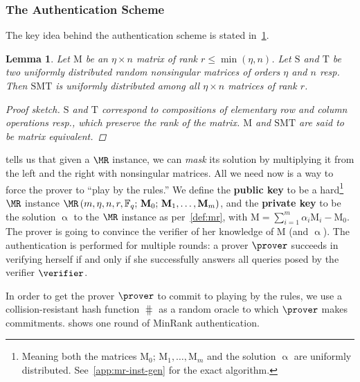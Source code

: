 \documentclass{article}
\theoremstyle{remark}
\theoremstyle{definition}
\theoremstyle{plain}
\newtheorem{lemma}{Lemma}
\renewcommand*{\vec}[1]{\bm{\mathrm{#1}}}
\newcommand{\matr}[1]{\bm{\mathrm{#1}}}
\begin{document}
\subsubsection{The Authentication Scheme}\label{sec:sch}
The key idea behind the authentication scheme is stated in~\cref{lem:rnk-mask}.
\begin{lemma}\label{lem:rnk-mask}
  Let $\matr{M}$ be an $\eta \times n$ matrix of rank $r \le \min(\eta, n)$.
  Let $\matr{S}$ and $\matr{T}$ be two uniformly distributed random nonsingular
  matrices of orders $\eta$ and $n$ resp.  Then $\matr{S M T}$ is uniformly
  distributed among all $\eta \times n$ matrices of rank $r$.
  \begin{proof}[Proof sketch]
    $\matr{S}$ and $\matr{T}$ correspond to compositions of elementary row and
    column operations resp., which preserve the rank of the matrix.  $\matr{M}$
    and $\matr{S M T}$ are said to be \emph{matrix equivalent}.
  \end{proof}
\end{lemma}

 tells us that given a $\MR$ instance, we can \emph{mask} its
solution by multiplying it from the left and the right with nonsingular
matrices.  All we need now is a way to force the prover to ``play by the
rules.''  We define the \textbf{public key} to be a hard\footnote{Meaning both
  the matrices $\matr{M}_0;\, \matr{M}_1, \ldots, \matr{M}_m$ and the solution
  $\vec{\upalpha}$ are uniformly distributed.  See~\cref{app:mr-inst-gen} for
  the exact algorithm.} $\MR$ instance
$\MR\left(m, \eta, n, r, \mathbb{F}_q;\, \matr{M}_0;\, \matr{M}_1, \ldots,
  \matr{M}_m\right)$, and the \textbf{private key} to be the solution
$\vec{\upalpha}$ to the $\MR$ instance as per~\cref{def:mr}, with
$\matr{M} = \sum\nolimits_{i = 1}^{m} \alpha_i \matr{M}_i - \matr{M}_0$.  The
prover is going to convince the verifier of her knowledge of $\matr{M}$ (and
$\vec{\upalpha}$).  The authentication is performed for multiple rounds: a
prover $\prover$ succeeds in verifying herself if and only if she successfully
answers all queries posed by the verifier $\verifier$.

In order to get the prover $\prover$ to commit to playing by the rules, we use a
collision-resistant hash function $\hash$ as a random oracle to which $\prover$
makes commitments.   shows one round of MinRank authentication.
\end{document}
